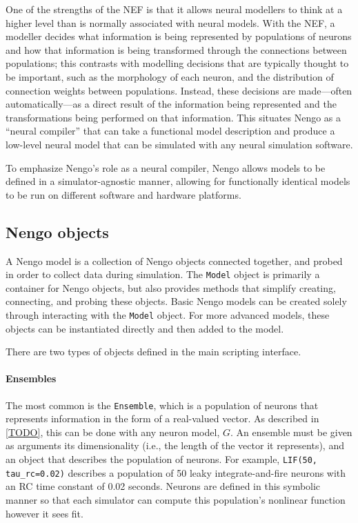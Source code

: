 \documentclass{frontiersSCNS}
\begin{document}
One of the strengths of the NEF
is that it allows neural modellers to think
at a higher level
than is normally associated with neural models.
With the NEF, a modeller decides
what information is being represented
by populations of neurons and how that information
is being transformed through the connections
between populations;
this contrasts with modelling decisions
that are typically thought to be important,
such as the morphology of each neuron,
and the distribution of connection weights
between populations.
Instead, these decisions are made---often
automatically---as a direct result
of the information
being represented and the transformations
being performed on that information.
This situates Nengo as a
``neural compiler'' that can
take a functional model description
and produce a low-level neural model
that can be simulated
with any neural simulation software.

To emphasize Nengo's role as a neural compiler,
Nengo allows models to be defined
in a simulator-agnostic manner,
allowing for functionally identical models to be run
on different software and hardware platforms.

\subsection{Nengo objects} \label{sec:objects}

A Nengo model is a collection
of Nengo objects connected together,
and probed in order to collect data
during simulation.
The \texttt{Model} object is primarily a container
for Nengo objects,
but also provides methods
that simplify creating, connecting,
and probing these objects.
Basic Nengo models
can be created solely through interacting
with the \texttt{Model} object.
For more advanced models,
these objects can be instantiated
directly and then added to the model.

There are two types of objects
defined in the main scripting interface.

\paragraph{Ensembles}
The most common is the \texttt{Ensemble},
which is a population of neurons
that represents information
in the form of a real-valued vector.
As described in \eqref{TODO},
this can be done
with any neuron model, $G$.
An ensemble must be given as arguments
its dimensionality
(i.e., the length of the vector it represents),
and an object that describes
the population of neurons.
For example, \texttt{LIF(50, tau\_rc=0.02)}
describes a population
of 50 leaky integrate-and-fire neurons
with an RC time constant of 0.02 seconds.
Neurons are defined in this symbolic manner
so that each simulator can compute
this population's nonlinear function
however it sees fit.
\end{document}
